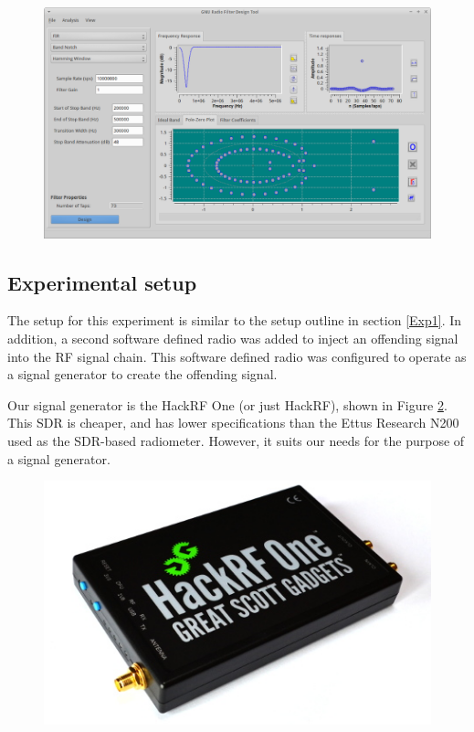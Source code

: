 \begin{figure}[h!tb] \centering
\includegraphics[width=\textwidth]{Images/GNURadio_Filter_dsn.png}
\label{GRC_Filter_DSN}
\end{figure}  

\subsection{Experimental setup} \label{exp3_setup}

The setup for this experiment is similar to the setup outline in section \ref{Exp1}.  In addition, a second software defined radio was added to inject an offending signal into the RF signal chain.  This software defined radio was configured to operate as a signal generator to create the offending signal.  

Our signal generator is the HackRF One (or just HackRF), shown in Figure \ref{HackRF}.  This SDR is cheaper, and has lower specifications than the Ettus Research N200 used as the SDR-based radiometer.  However, it suits our needs for the purpose of a signal generator.

\begin{figure}[h!tb] \centering

\includegraphics[width=12cm]{Images/hackrf.jpg}
\label{HackRF}
\end{figure} 

